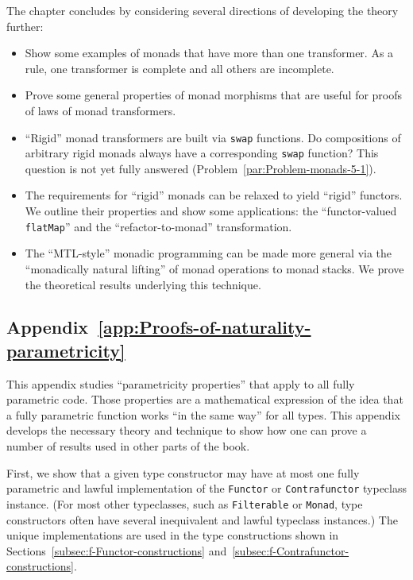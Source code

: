 The chapter concludes by considering several directions of developing
the theory further:
\begin{itemize}
\item Show some examples of monads that have more than one transformer.
As a rule, one transformer is complete and all others are incomplete.
\item Prove some general properties of monad morphisms that are useful for
proofs of laws of monad transformers.
\item \textsf{``}Rigid\textsf{''} monad transformers are built via \lstinline!swap! functions.
Do compositions of arbitrary rigid monads always have a corresponding
\lstinline!swap! function? This question is not yet fully answered
(Problem~\ref{par:Problem-monads-5-1}).
\item The requirements for \textsf{``}rigid\textsf{''} monads can be relaxed to yield \textsf{``}rigid\textsf{''}
functors. We outline their properties and show some applications:
the \textsf{``}functor-valued \lstinline!flatMap!\textsf{''} and the \textsf{``}refactor-to-monad\textsf{''}
transformation.
\item The \textsf{``}MTL-style\textsf{''} monadic programming can be made more general via
the \textsf{``}monadically natural lifting\textsf{''} of monad operations to monad
stacks. We prove the theoretical results underlying this technique.
\end{itemize}

\subsection{Appendix~\ref{app:Proofs-of-naturality-parametricity}}

This appendix studies \textsf{``}parametricity properties\textsf{''} that apply to
all fully parametric code. Those properties are a mathematical expression
of the idea that a fully parametric function works \textsf{``}in the same
way\textsf{''} for all types. This appendix develops the necessary theory
and technique to show how one can prove a number of results used in
other parts of the book.

First, we show that a given type constructor may have at most one
fully parametric and lawful implementation of the \lstinline!Functor!
or \lstinline!Contrafunctor! typeclass instance. (For most other
typeclasses, such as \lstinline!Filterable! or \lstinline!Monad!,
type constructors often have several inequivalent and lawful typeclass
instances.) The unique implementations are used in the type constructions
shown in Sections~\ref{subsec:f-Functor-constructions} and~\ref{subsec:f-Contrafunctor-constructions}.

